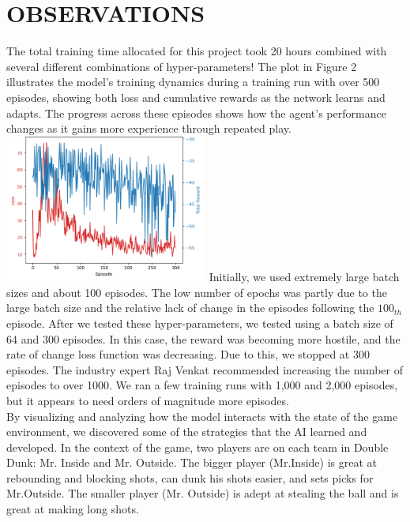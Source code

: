 \documentclass[letterpaper, 10 pt, conference]{ieeeconf}
\begin{document}
\vspace{.5cm}
\section{\textbf{OBSERVATIONS}}
\vspace{.5cm}
The total training time allocated for this project took 20 hours combined with several different combinations of hyper-parameters! The plot in Figure 2 illustrates the model's training dynamics during a training run with over 500 episodes, showing both loss and cumulative rewards as the network learns and adapts. The progress across these episodes shows how the agent’s performance changes as it gains more experience through repeated play.\\

    \includegraphics[width=0.5\textwidth]{training.png}
    \vspace{.5cm}
Initially, we used extremely large batch sizes and about 100 episodes. The low number of epochs was partly due to the large batch size and the relative lack of change in the episodes following the $100_{th}$ episode. After we tested these hyper-parameters, we tested using a batch size of 64 and 300 episodes. In this case, the reward was becoming more hostile, and the rate of change loss function was decreasing. Due to this, we stopped at 300 episodes. The industry expert Raj Venkat recommended increasing the number of episodes to over 1000. We ran a few training runs with 1,000 and 2,000 episodes, but it appears to need orders of magnitude more episodes.\\

By visualizing and analyzing how the model interacts with the state of the game environment, we discovered some of the strategies that the AI learned and developed. In the context of the game, two players are on each team in Double Dunk: Mr. Inside and Mr. Outside. The bigger player (Mr.Inside) is great at rebounding and blocking shots, can dunk his shots easier, and sets picks for Mr.Outside. The smaller player (Mr. Outside) is adept at stealing the ball and is great at making long shots. \\
\end{document}
